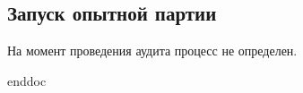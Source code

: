 \subsection{Запуск опытной партии}
%

На момент проведения аудита процесс не определен.




 {enddoc}
